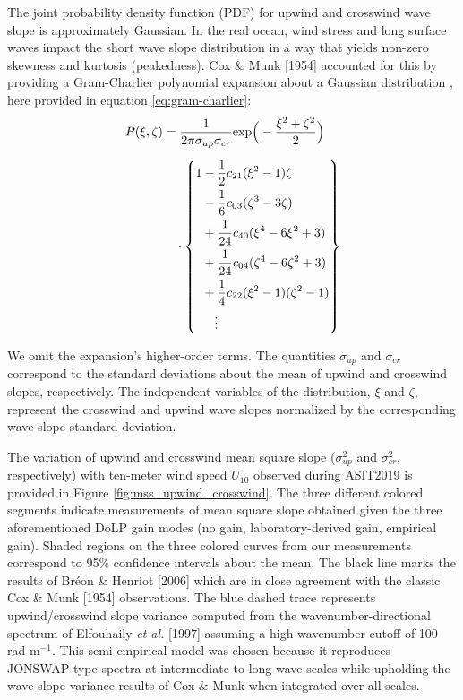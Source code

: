 \documentclass[letterpaper,journal]{IEEEtran}
\begin{document}
The joint probability density function (PDF) for upwind and crosswind wave slope is approximately Gaussian. In the real ocean, wind stress and long surface waves impact the short wave slope distribution in a way that yields non-zero skewness and kurtosis (peakedness). Cox \& Munk [1954] accounted for this by providing a Gram-Charlier polynomial expansion about a Gaussian distribution \cite{Cox1954a}, here provided in equation \ref{eq:gram-charlier}:
\begin{align}\label{eq:gram-charlier}
\begin{split}
P(\xi,\zeta)
  &= \frac{1}{2\pi\sigma_{up}\sigma_{cr}}\mathrm{exp}\Big(-\frac{\xi^2+\zeta^2}{2}\Big)          \\[6pt]
  &\quad\hfill
     \cdot\left\{
     \begin{aligned}
       1 &- \frac{1}{2}c_{21}(\xi^2-1)\zeta\\
       &- \frac{1}{6}c_{03}(\zeta^3-3\zeta)\\
       &+ \frac{1}{24}c_{40}(\xi^4-6\xi^2+3)\\
       &+ \frac{1}{24}c_{04}(\zeta^4-6\zeta^2+3)\\
       &+ \frac{1}{4}c_{22}(\xi^2-1)(\zeta^2-1)\\
       &\quad\vdots
     \end{aligned}
     \right\}
\end{split}
\end{align}

We omit the expansion's higher-order terms. The quantities $\sigma_{up}$ and $\sigma_{cr}$ correspond to the standard deviations about the mean of upwind and crosswind slopes, respectively. The independent variables of the distribution, $\xi$ and $\zeta$, represent the crosswind and upwind wave slopes normalized by the corresponding wave slope standard deviation.

The variation of upwind and crosswind mean square slope ($\sigma_{up}^2$ and $\sigma_{cr}^2$, respectively) with ten-meter wind speed $U_{10}$ observed during ASIT2019 is provided in Figure \ref{fig:mss_upwind_crosswind}. The three different colored segments indicate measurements of mean square slope obtained given the three aforementioned DoLP gain modes (no gain, laboratory-derived gain, empirical gain). Shaded regions on the three colored curves from our measurements correspond to 95\% confidence intervals about the mean. The black line marks the results of Br\'eon \& Henriot [2006] \cite{Breon2006} which are in close agreement with the classic Cox \& Munk [1954] \cite{Cox1954a} observations. The blue dashed trace represents upwind/crosswind slope variance computed from the wavenumber-directional spectrum of Elfouhaily \emph{et al.} [1997] assuming a high wavenumber cutoff of 100 rad m$^{-1}$. This semi-empirical model \cite{Elfouhaily1997} was chosen because it reproduces JONSWAP-type spectra \cite{Hasselmann1973} at intermediate to long wave scales while upholding the wave slope variance results of Cox \& Munk \cite{Cox1954a} when integrated over all scales.
\end{document}
